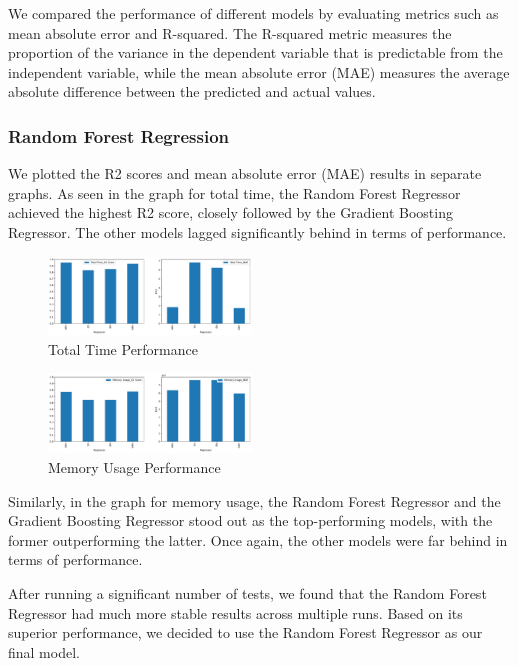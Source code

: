 \documentclass[conference]{IEEEtran}
\begin{document}
We compared the performance of different models by evaluating metrics such as mean absolute error and R-squared. The R-squared metric measures the proportion of the variance in the dependent variable that is predictable from the independent variable, while the mean absolute error (MAE) measures the average absolute difference between the predicted and actual values.

\subsubsection{Random Forest Regression}
We plotted the R2 scores and mean absolute error (MAE) results in separate graphs. As seen in the graph for total time, the Random Forest Regressor achieved the highest R2 score, closely followed by the Gradient Boosting Regressor. The other models lagged significantly behind in terms of performance.

\begin{figure}[ht]
  \centering
  \includegraphics[width=0.48\textwidth]{plots/model_performance_results/random_forest_total_time_results.pdf}
  \caption{Total Time Performance}
\end{figure}

\begin{figure}[ht]
  \centering
  \includegraphics[width=0.48\textwidth]{plots/model_performance_results/random_forest_memory_results.pdf}
  \caption{Memory Usage Performance}
\end{figure}

Similarly, in the graph for memory usage, the Random Forest Regressor and the Gradient Boosting Regressor stood out as the top-performing models, with the former outperforming the latter. Once again, the other models were far behind in terms of performance.

After running a significant number of tests, we found that the Random Forest Regressor had much more stable results across multiple runs. Based on its superior performance, we decided to use the Random Forest Regressor as our final model.
\end{document}
